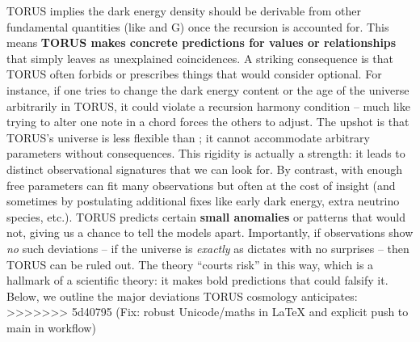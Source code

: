 \documentclass[]{article}
\begin{document}
TORUS implies the dark energy density should be derivable from other
fundamental quantities (like \alpha and G) once the recursion is accounted
for​. This means \textbf{TORUS makes concrete predictions for values or
relationships} that \LambdaCDM simply leaves as unexplained coincidences. A
striking consequence is that TORUS often forbids or prescribes things
that \LambdaCDM would consider optional. For instance, if one tries to change
the dark energy content or the age of the universe arbitrarily in TORUS,
it could violate a recursion harmony condition -- much like trying to
alter one note in a chord forces the others to adjust. The upshot is
that TORUS's universe is less flexible than \LambdaCDM; it cannot accommodate
arbitrary parameters without consequences. This rigidity is actually a
strength: it leads to distinct observational signatures that we can look
for. By contrast, \LambdaCDM with enough free parameters can fit many
observations but often at the cost of insight (and sometimes by
postulating additional fixes like early dark energy, extra neutrino
species, etc.). TORUS predicts certain \textbf{small anomalies} or
patterns that \LambdaCDM would not, giving us a chance to tell the models
apart. Importantly, if observations show \emph{no} such deviations -- if
the universe is \emph{exactly} as \LambdaCDM dictates with no surprises --
then TORUS can be ruled out. The theory ``courts risk'' in this way​,
which is a hallmark of a scientific theory: it makes bold predictions
that could falsify it. Below, we outline the major deviations TORUS
cosmology anticipates:
>>>>>>> 5d40795 (Fix: robust Unicode/maths in LaTeX and explicit push to main in workflow)
\end{document}
